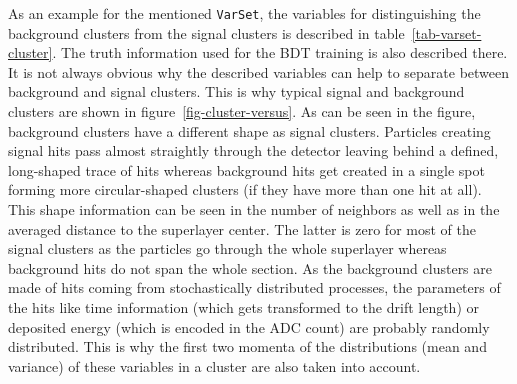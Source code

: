 As an example for the mentioned \texttt{VarSet}, the variables for distinguishing the background clusters from the signal clusters is described in table~\ref{tab-varset-cluster}. The truth information used for the BDT training is also described there. It is not always obvious why the described variables can help to separate between background and signal clusters. This is why typical signal and background clusters are shown in figure~\ref{fig-cluster-versus}. As can be seen in the figure, background clusters have a different shape as signal clusters. Particles creating signal hits pass almost straightly through the detector leaving behind a defined, long-shaped trace of hits whereas background hits get created in a single spot forming more circular-shaped clusters (if they have more than one hit at all). This shape information can be seen in the number of neighbors as well as in the averaged distance to the superlayer center. The latter is zero for most of the signal clusters as the particles go through the whole superlayer whereas background hits do not span the whole section. As the background clusters are made of hits coming from stochastically distributed processes, the parameters of the hits like time information (which gets transformed to the drift length) or deposited energy (which is encoded in the ADC count) are probably randomly distributed. This is why the first two momenta of the distributions (mean and variance) of these variables in a cluster are also taken into account.

